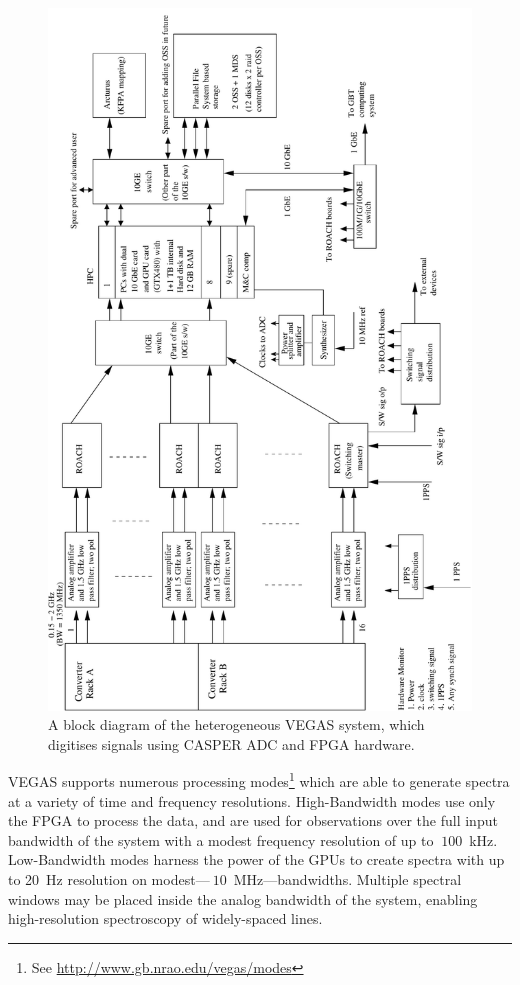 \documentclass{ws-jai}
\begin{document}
\begin{figure}[htb]
 \centering
 \includegraphics[angle=270,origin=c, width=\textwidth]{./figures/vegas-block.pdf}
 \caption{A block diagram of the heterogeneous VEGAS system, which digitises signals using CASPER ADC and FPGA hardware.}
 \label{fig:vegas}
\end{figure}


VEGAS supports numerous processing modes\footnote{See
\url{http://www.gb.nrao.edu/vegas/modes}} which are able to generate spectra at a variety of time and frequency resolutions. High-Bandwidth modes use only the FPGA to process the data, and are used for observations over the full input bandwidth of the system with a modest frequency resolution of up to $~100$~kHz. Low-Bandwidth modes harness the power of the GPUs to create spectra with up to 20~Hz resolution
on modest---$~10$~MHz---bandwidths.  Multiple spectral windows may be placed
inside the analog bandwidth of the system, enabling high-resolution
spectroscopy of widely-spaced lines.
\end{document}

